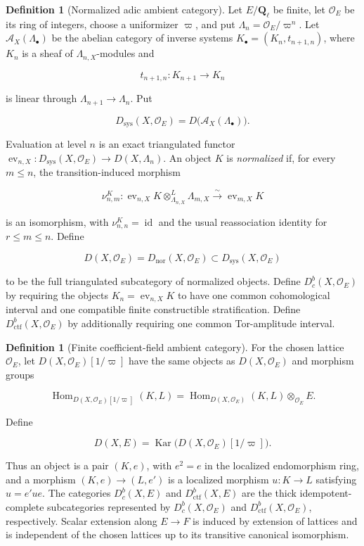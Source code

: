 \documentclass[10pt]{article}
\theoremstyle{definition}
\newtheorem{definition}[theorem]{Definition}
\newcommand{\Ql}{\mathbf Q_\ell}
\newcommand{\OO}{\mathcal O}
\newcommand{\Dbc}{D^b_c}
\newcommand{\Dctf}{D^b_{\mathrm{ctf}}}
\begin{document}
\begin{definition}[Normalized adic ambient category]
Let \(E/\Ql\) be finite, let \(\OO_E\) be its ring of integers, choose a
uniformizer \(\varpi\), and put \(\Lambda_n=\OO_E/\varpi^n\).  Let
\(\mathcal A_X(\Lambda_\bullet)\) be the abelian category of inverse systems
\(K_\bullet=(K_n,t_{n+1,n})\), where \(K_n\) is a sheaf of
\(\Lambda_{n,X}\)-modules and

\[
 t_{n+1,n}:K_{n+1}\longrightarrow K_n
\]

is linear through \(\Lambda_{n+1}\to\Lambda_n\).  Put

\[
 D_{\mathrm{sys}}(X,\OO_E)
 =D\bigl(\mathcal A_X(\Lambda_\bullet)\bigr).
\]

Evaluation at level \(n\) is an exact triangulated functor
\(\operatorname{ev}_{n,X}:D_{\mathrm{sys}}(X,\OO_E)\to D(X,\Lambda_n)\).
An object \(K\) is \emph{normalized} if, for every \(m\leq n\), the
transition-induced morphism

\[
 \nu^K_{n,m}:
 \operatorname{ev}_{n,X}K\otimes^L_{\Lambda_{n,X}}\Lambda_{m,X}
 \xrightarrow{\sim}\operatorname{ev}_{m,X}K
\]

is an isomorphism, with \(\nu^K_{n,n}=\operatorname{id}\) and the usual
reassociation identity for \(r\leq m\leq n\).  Define

\[
 D(X,\OO_E)=D_{\mathrm{nor}}(X,\OO_E)
 \subset D_{\mathrm{sys}}(X,\OO_E)
\]

to be the full triangulated subcategory of normalized objects.  Define
\(\Dbc(X,\OO_E)\) by requiring the objects
\(K_n=\operatorname{ev}_{n,X}K\) to have one common cohomological interval
and one compatible finite constructible stratification.  Define
\(\Dctf(X,\OO_E)\) by additionally requiring one common Tor-amplitude
interval.
\end{definition}

\begin{definition}[Finite coefficient-field ambient category]
For the chosen lattice \(\OO_E\), let
\(D(X,\OO_E)[1/\varpi]\) have the same objects as
\(D(X,\OO_E)\) and morphism groups

\[
 \operatorname{Hom}_{D(X,\OO_E)[1/\varpi]}(K,L)
 =\operatorname{Hom}_{D(X,\OO_E)}(K,L)\otimes_{\OO_E}E.
\]

Define

\[
 D(X,E)=\operatorname{Kar}\bigl(D(X,\OO_E)[1/\varpi]\bigr).
\]

Thus an object is a pair \((K,e)\), with \(e^2=e\) in the localized
endomorphism ring, and a morphism \((K,e)\to(L,e')\) is a localized
morphism \(u:K\to L\) satisfying \(u=e'ue\).  The categories
\(\Dbc(X,E)\) and \(\Dctf(X,E)\) are the thick idempotent-complete
subcategories represented by \(\Dbc(X,\OO_E)\) and
\(\Dctf(X,\OO_E)\), respectively.  Scalar extension along \(E\to F\)
is induced by extension of lattices and is independent of the chosen
lattices up to its transitive canonical isomorphism.
\end{definition}
\end{document}
